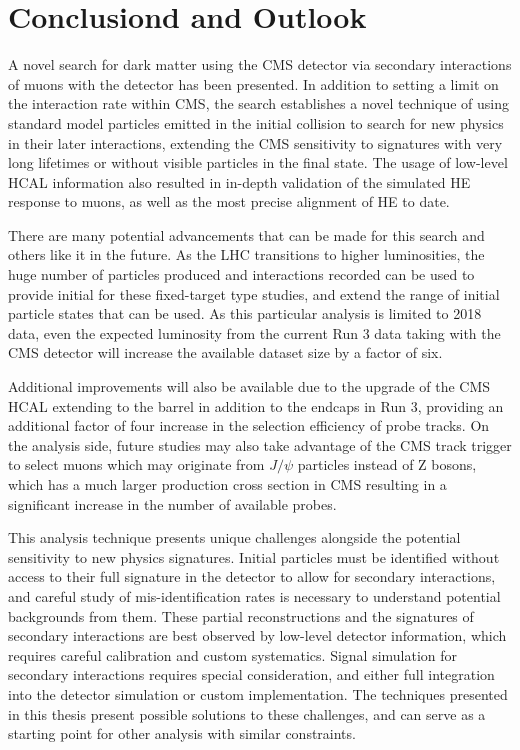 \chapter{Conclusiond and Outlook}
\label{conclusion_chapter}

A novel search for dark matter using the CMS detector via secondary interactions of muons with the detector has been presented.
In addition to setting a limit on the \dbrem interaction rate within CMS, the search establishes a novel technique of using standard model particles emitted in the initial collision to search for new physics in their later interactions, extending the CMS sensitivity to signatures with very long lifetimes or without visible particles in the final state.
The usage of low-level HCAL information also resulted in in-depth validation of the simulated HE response to muons, as well as the most precise alignment of HE to date.

There are many potential advancements that can be made for this search and others like it in the future. 
As the LHC transitions to higher luminosities, the huge number of particles produced and interactions recorded can be used to provide initial for these fixed-target type studies, and extend the range of initial particle states that can be used.
As this particular analysis is limited to 2018 data, even the expected luminosity from the current Run 3 data taking with the CMS detector will increase the available dataset size by a factor of six.

Additional improvements will also be available due to the upgrade of the CMS HCAL extending to the barrel in addition to the endcaps in Run 3, providing an additional factor of four increase in the selection efficiency of probe tracks.
On the analysis side, future studies may also take advantage of the CMS track trigger to select muons which may originate from $J/\psi$ particles instead of Z bosons, which has a much larger production cross section in CMS resulting in a significant increase in the number of available probes.

This analysis technique presents unique challenges alongside the potential sensitivity to new physics signatures. 
Initial particles must be identified without access to their full signature in the detector to allow for secondary interactions, and careful study of mis-identification rates is necessary to understand potential backgrounds from them.
These partial reconstructions and the signatures of secondary interactions are best observed by low-level detector information, which requires careful calibration and custom systematics.
Signal simulation for secondary interactions requires special consideration, and either full integration into the detector simulation or custom implementation.
The techniques presented in this thesis present possible solutions to these challenges, and can serve as a starting point for other analysis with similar constraints.

